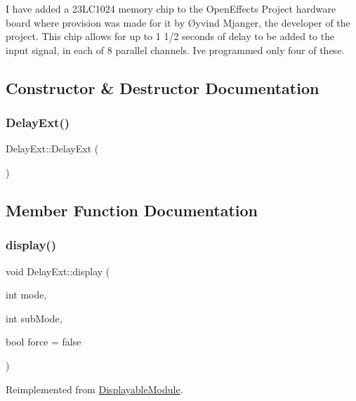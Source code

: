 I have added a 23\+L\+C1024 memory chip to the Open\+Effects Project hardware board where provision was made for it by Øyvind Mjanger, the developer of the project. This chip allows for up to 1 1/2 seconds of delay to be added to the input signal, in each of 8 parallel channels. I\textquotesingle{}ve programmed only four of these. 

\subsection{Constructor \& Destructor Documentation}
\mbox{\label{class_delay_ext_ad0b56c7a3db3c36dc02ac08ff59ca809}} 
\subsubsection{\texorpdfstring{Delay\+Ext()}{DelayExt()}}
{\footnotesize\ttfamily Delay\+Ext\+::\+Delay\+Ext (\begin{DoxyParamCaption}{ }\end{DoxyParamCaption})}



\subsection{Member Function Documentation}
\mbox{\label{class_delay_ext_a53d22982c98ab7cc1206744304ecd5a9}} 
\subsubsection{\texorpdfstring{display()}{display()}}
{\footnotesize\ttfamily void Delay\+Ext\+::display (\begin{DoxyParamCaption}\item[{int}]{mode,  }\item[{int}]{sub\+Mode,  }\item[{bool}]{force = {\ttfamily false} }\end{DoxyParamCaption})\hspace{0.3cm}{\ttfamily [virtual]}}



Reimplemented from \mbox{\hyperlink{class_displayable_module_a02de26d62ef508cae9ed07920e21784d}{Displayable\+Module}}.

